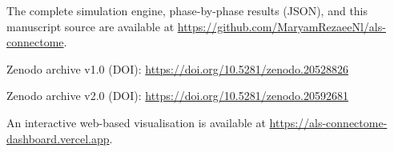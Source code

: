 \documentclass[12pt,a4paper]{article}
\begin{document}
The complete simulation engine, phase-by-phase results (JSON), and this manuscript source are
available at \url{https://github.com/MaryamRezaeeNl/als-connectome}.

Zenodo archive v1.0 (DOI): \url{https://doi.org/10.5281/zenodo.20528826}

Zenodo archive v2.0 (DOI): \url{https://doi.org/10.5281/zenodo.20592681}

An interactive web-based visualisation is available at
\url{https://als-connectome-dashboard.vercel.app}.



\end{document}

